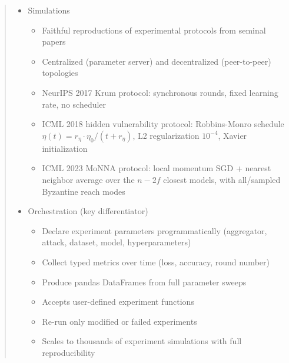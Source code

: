 \documentclass[twoside,11pt]{article}
\begin{document}
\begin{abstract}
{\begin{itemize}
\begin{itemize}
\begin{itemize}
            \item Model wrapper providing zero-copy flat tensor views of parameters and gradients (shares memory with the underlying torch module)
            \item Standard architectures from the literature: Krum2017CNN, Monna2023CNNMnist, ...
            \item Management of i.i.d. and non-i.i.d. data partitioning scenarios
            \item Stateless classmethod interface with consistent signature for aggregators and attacks
            \item Extensibility via abstract base classes (Aggregator, Attack) with a single method to override
        \end{itemize}
        \item Simulations
        \begin{itemize}
            \item Faithful reproductions of experimental protocols from seminal papers
            \item Centralized (parameter server) and decentralized (peer-to-peer) topologies
            \item NeurIPS 2017 Krum protocol: synchronous rounds, fixed learning rate, no scheduler
            \item ICML 2018 hidden vulnerability protocol: Robbins-Monro schedule $\eta(t) = r_\eta \cdot \eta_0 / (t + r_\eta)$, L2 regularization $10^{-4}$, Xavier initialization
            \item ICML 2023 MoNNA protocol: local momentum SGD + nearest neighbor average over the $n - 2f$ closest models, with all/sampled Byzantine reach modes
        \end{itemize}
        \item Orchestration (key differentiator)
        \begin{itemize}
            \item Declare experiment parameters programmatically (aggregator, attack, dataset, model, hyperparameters)
            \item Collect typed metrics over time (loss, accuracy, round number)
            \item Produce pandas DataFrames from full parameter sweeps
            \item Accepts user-defined experiment functions
            \item Re-run only modified or failed experiments
            \item Scales to thousands of experiment simulations with full reproducibility

\end{itemize}
\end{itemize}
\end{itemize}}
\end{abstract}
\end{document}
